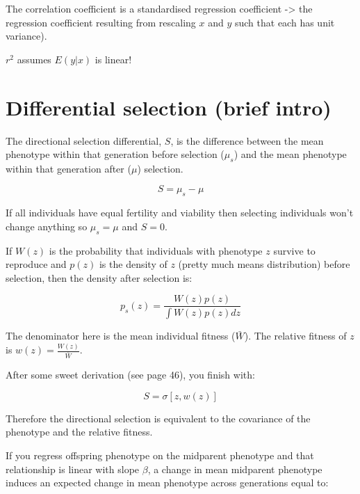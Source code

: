 \documentclass[
]{book}
\begin{document}
The correlation coefficient is a standardised regression coefficient -\textgreater{} the regression coefficient resulting from rescaling \(x\) and \(y\) such that each has unit variance).

\(r^2\) assumes \(E(y|x)\) is linear!

\hypertarget{differential-selection-brief-intro}{%
\section{Differential selection (brief intro)}\label{differential-selection-brief-intro}}

The directional selection differential, \(S\), is the difference between the mean phenotype within that generation before selection (\(\mu_s\)) and the mean phenotype within that generation after (\(\mu\)) selection.

\begin{equation}
  S = \mu_s - \mu
  \label{eq:selection-differential}
\end{equation}

If all individuals have equal fertility and viability then selecting individuals won't change anything so \(\mu_s = \mu\) and \(S = 0\).

If \(W(z)\) is the probability that individuals with phenotype \(z\) survive to reproduce and \(p(z)\) is the density of \(z\) (pretty much means distribution) before selection, then the density after selection is:

\begin{equation}
  p_{s}(z) = \frac{W(z)p(z)} {\int W(z)p(z)dz}
  \label{eq:density-after-selection}
\end{equation}

The denominator here is the mean individual fitness (\(\bar{W}\)). The relative fitness of \(z\) is \(w(z) = \frac{W(z)} {\bar{W}}\).

After some sweet derivation (see page 46), you finish with:

\begin{equation}
  S = \sigma[z, w(z)]
  \label{eq:selection-differential2}
\end{equation}

Therefore the directional selection is equivalent to the covariance of the phenotype and the relative fitness.

If you regress offspring phenotype on the midparent phenotype and that relationship is linear with slope \(\beta\), a change in mean midparent phenotype induces an expected change in mean phenotype across generations equal to:
\end{document}
